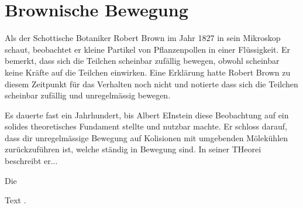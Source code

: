 %
%
%
%
\section{Brownische Bewegung\label{brown:section:teil0}}

Als der Schottische Botaniker Robert Brown im Jahr 1827 in sein Mikroskop schaut, beobachtet er kleine Partikel von Pflanzenpollen in einer Flüssigkeit. Er bemerkt, dass sich die Teilchen scheinbar zufällig bewegen, obwohl scheinbar keine Kräfte auf die Teilchen einwirken. Eine Erklärung hatte Robert Brown zu diesem Zeitpunkt für das Verhalten noch nicht und notierte dass sich die Teilchen scheinbar zufällig und unregelmässig bewegen.

Es dauerte fast ein Jahrhundert, bis Albert EInstein diese Beobachtung auf ein solides theoretisches Fundament stellte und nutzbar machte. Er schloss darauf, dass dir unregelmässige Bewegung auf Kolisionen mit umgebenden Mölekühlen zurückzuführen ist, welche ständig in Bewegung sind. In seiner THeorei beschreibt er...

Die 



Text
\cite{brown:bibtex}.


